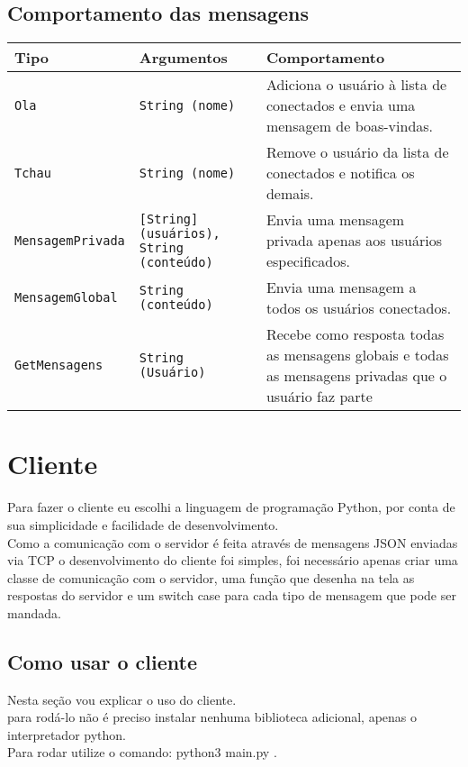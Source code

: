 \documentclass{article}
\begin{document}
{{        \subsection{Comportamento das mensagens}
        {
            \begin{table}[h!]
                \centering
                \begin{tabular}{|p{4.8cm}|p{4.8cm}|p{4.8cm}|}
                    \hline
                    \textbf{Tipo} & \textbf{Argumentos} & \textbf{Comportamento} \\
                    \hline
                    \texttt{Ola} & \texttt{String (nome)} & Adiciona o usuário à lista de conectados e envia uma mensagem de boas-vindas. \\
                    \hline
                    \texttt{Tchau} & \texttt{String (nome)} & Remove o usuário da lista de conectados e notifica os demais. \\
                    \hline
                    \texttt{MensagemPrivada} & \texttt{[String] (usuários), String (conteúdo)} & Envia uma mensagem privada apenas aos usuários especificados. \\
                    \hline
                    \texttt{MensagemGlobal} & \texttt{String (conteúdo)} & Envia uma mensagem a todos os usuários conectados. \\
                    \hline
                    \texttt{GetMensagens} & \texttt{String (Usuário)} & Recebe como resposta todas as mensagens globais e todas as mensagens privadas que o usuário faz parte\\
                    \hline
                \end{tabular}
            \end{table}
        }
    }

    \section{Cliente}
    {
        Para fazer o cliente eu escolhi a linguagem de programação Python, por conta de sua simplicidade e facilidade de desenvolvimento.
        \\Como a comunicação com o servidor é feita através de mensagens JSON enviadas via TCP o desenvolvimento do cliente foi simples, foi necessário apenas criar uma classe de comunicação com o servidor, uma função que desenha na tela as respostas do servidor e um switch case para cada tipo de mensagem que pode ser mandada.
    }
    \subsection{Como usar o cliente}
    {
        Nesta seção vou explicar o uso do cliente.\\
        para rodá-lo não é preciso instalar nenhuma biblioteca adicional, apenas o interpretador python. \\
        Para rodar utilize o comando: python3 main.py .\\
}}
\end{document}
